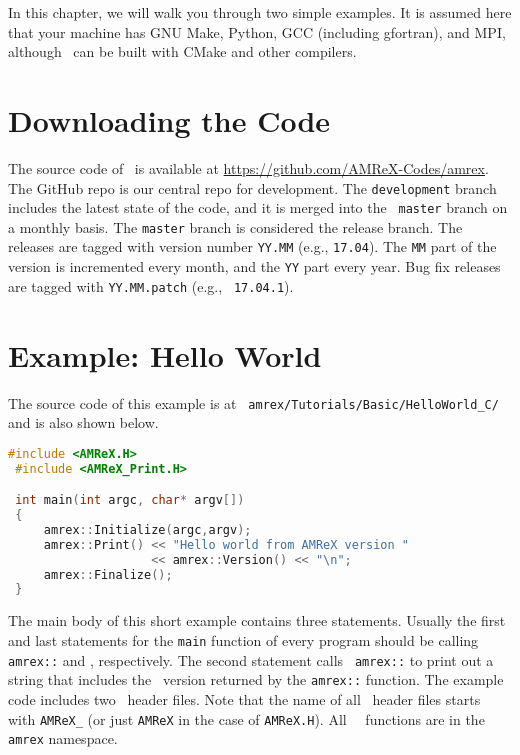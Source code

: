 In this chapter, we will walk you through two simple examples.  It is
assumed here that your machine has GNU Make, Python, GCC (including
gfortran), and MPI, although \amrex\ can be built with CMake and other
compilers. 

\section{Downloading the Code}

The source code of \amrex\ is available at
\url{https://github.com/AMReX-Codes/amrex}.  The GitHub repo is our
central repo for development.  The {\tt development} branch
includes the latest state of the code, and it is merged into the {\tt
  master} branch on a monthly basis.  The {\tt master} branch is
considered the release branch.  The releases are tagged with version
number {\tt YY.MM} (e.g., {\tt 17.04}).  The {\tt MM} part of the
version is incremented every month, and the {\tt YY} part every year.
Bug fix releases are tagged with {\tt YY.MM.patch} (e.g., {\tt
  17.04.1}).

\section{Example: Hello World}

The source code of this example is at {\tt
  amrex/Tutorials/Basic/HelloWorld\_C/} and is also shown below. 

\begin{lstlisting}[language=cpp]
 #include <AMReX.H>
 #include <AMReX_Print.H>

 int main(int argc, char* argv[])
 {
     amrex::Initialize(argc,argv);
     amrex::Print() << "Hello world from AMReX version " 
                    << amrex::Version() << "\n";
     amrex::Finalize();
 }
\end{lstlisting}

The main body of this short example contains three statements.
Usually the first and last statements for the {\tt main} function of
every program should be calling {\tt amrex::} and
, respectively.  The second statement calls {\tt
  amrex::} to print out a string that includes the
\amrex\ version returned by the {\tt amrex::}
function.  The example code includes two \amrex\ header files.  Note
that the name of all \amrex\ header files starts with {\tt AMReX\_}
(or just {\tt AMReX} in the case of {\tt AMReX.H}).  All \amrex\
\cpp\ functions are in the {\tt amrex} namespace.  


